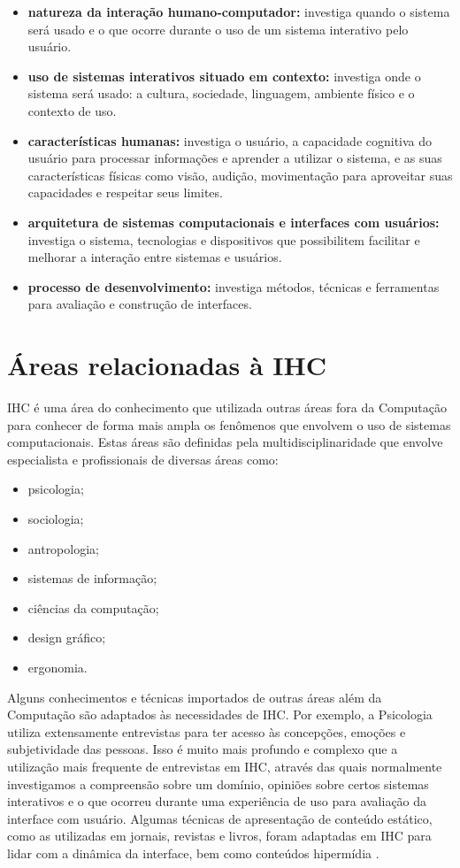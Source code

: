 \begin{itemize}
    \item \textbf{natureza da interação humano-computador:} investiga quando o sistema será usado e o que ocorre durante o uso de um sistema interativo pelo usuário.
    \item \textbf{uso de sistemas interativos situado em contexto:} investiga onde o sistema será usado: a cultura, sociedade, linguagem, ambiente físico e o contexto de uso.
    \item \textbf{características humanas:} investiga o usuário, a capacidade cognitiva do usuário para processar informações e aprender a utilizar o sistema, e as suas características físicas como visão, audição, movimentação para aproveitar suas capacidades e respeitar seus limites.
    \item \textbf{arquitetura de sistemas computacionais e interfaces com usuários:} investiga o sistema, tecnologias e dispositivos que possibilitem facilitar e melhorar a interação entre sistemas e usuários.
    \item \textbf{processo de desenvolvimento:} investiga métodos, técnicas e ferramentas para avaliação e construção de interfaces.
\end{itemize}

\section{Áreas relacionadas à IHC}

IHC é uma área do conhecimento que utilizada outras áreas fora da Computação
para conhecer de forma mais ampla os fenômenos que envolvem o uso de sistemas computacionais. Estas áreas são definidas pela multidisciplinaridade que envolve especialista e profissionais de diversas áreas como:

\begin{itemize}
    \item psicologia;   
    \item sociologia;
    \item antropologia;
    \item sistemas de informação;
    \item ciências da computação;
    \item design gráfico;
    \item ergonomia.
\end{itemize}

Alguns conhecimentos e técnicas importados de outras áreas além da Computação
são adaptados às necessidades de IHC. Por exemplo, a Psicologia utiliza extensamente
entrevistas para ter acesso às concepções, emoções e subjetividade das
pessoas. Isso é muito mais profundo e complexo que a utilização mais frequente de
entrevistas em IHC, através das quais normalmente investigamos a compreensão sobre
um domínio, opiniões sobre certos sistemas interativos e o que ocorreu durante
uma experiência de uso para avaliação da interface com usuário. Algumas técnicas
de apresentação de conteúdo estático, como as utilizadas em jornais, revistas e livros, foram adaptadas em IHC para lidar com a dinâmica da interface, bem como conteúdos hipermídia \cite{barbosa2010IHC}.

